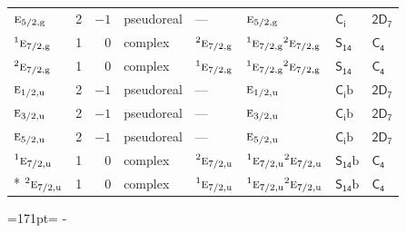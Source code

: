 \documentclass[10pt,a4paper]{article}
\newcommand{\needspace}[1]{\par\penalty-100\begingroup\dimen0=#1\relax\dimen2=\pagegoal
  \advance\dimen2-\pagetotal\ifdim\dimen0>\dimen2\relax\ifdim\dimen2>0pt\vfil\break\fi\fi
  \endgroup}
\numberwithin{equation}{section}
\newcommand{\grp}[1]{\mathsf{#1}}
\newcommand{\irr}[1]{\text{\normalfont\scshape #1}}
\newcommand{\conjpair}[1]{{}^{#1}}
\newcommand{\ptag}[1]{\mathrm{#1}}
\newcommand{\secondclass}{\mathrm{b}}
\begin{document}
{\begin{longtable}{@{}lrrlllll@{}}
$\irr{e}_{5/2,\ptag{g}}$ & 2 & $-1$ & pseudoreal & --- & $\irr{e}_{5/2,\ptag{g}}$ & \href{S2.pdf}{$\grp{C_{i}}$} & \href{2D7.pdf}{$\grp{2D_{7}}$}\\
$\conjpair{1}\irr{e}_{7/2,\ptag{g}}$ & 1 & $0$ & complex & $\conjpair{2}\irr{e}_{7/2,\ptag{g}}$ & $\conjpair{1}\irr{e}_{7/2,\ptag{g}}\conjpair{2}\irr{e}_{7/2,\ptag{g}}$ & \href{S14.pdf}{$\grp{S_{14}}$} & \href{../../../rotation/data/pdf/C4.pdf}{$\grp{C_{4}}$}\\
$\conjpair{2}\irr{e}_{7/2,\ptag{g}}$ & 1 & $0$ & complex & $\conjpair{1}\irr{e}_{7/2,\ptag{g}}$ & $\conjpair{1}\irr{e}_{7/2,\ptag{g}}\conjpair{2}\irr{e}_{7/2,\ptag{g}}$ & \href{S14.pdf}{$\grp{S_{14}}$} & \href{../../../rotation/data/pdf/C4.pdf}{$\grp{C_{4}}$}\\
$\irr{e}_{1/2,\ptag{u}}$ & 2 & $-1$ & pseudoreal & --- & $\irr{e}_{1/2,\ptag{u}}$ & \href{S2b.pdf}{$\grp{C_{i}}\secondclass$} & \href{2D7.pdf}{$\grp{2D_{7}}$}\\
$\irr{e}_{3/2,\ptag{u}}$ & 2 & $-1$ & pseudoreal & --- & $\irr{e}_{3/2,\ptag{u}}$ & \href{S2b.pdf}{$\grp{C_{i}}\secondclass$} & \href{2D7.pdf}{$\grp{2D_{7}}$}\\
$\irr{e}_{5/2,\ptag{u}}$ & 2 & $-1$ & pseudoreal & --- & $\irr{e}_{5/2,\ptag{u}}$ & \href{S2b.pdf}{$\grp{C_{i}}\secondclass$} & \href{2D7.pdf}{$\grp{2D_{7}}$}\\
$\conjpair{1}\irr{e}_{7/2,\ptag{u}}$ & 1 & $0$ & complex & $\conjpair{2}\irr{e}_{7/2,\ptag{u}}$ & $\conjpair{1}\irr{e}_{7/2,\ptag{u}}\conjpair{2}\irr{e}_{7/2,\ptag{u}}$ & \href{S14b.pdf}{$\grp{S_{14}}\secondclass$} & \href{../../../rotation/data/pdf/C4.pdf}{$\grp{C_{4}}$}\\*
$\conjpair{2}\irr{e}_{7/2,\ptag{u}}$ & 1 & $0$ & complex & $\conjpair{1}\irr{e}_{7/2,\ptag{u}}$ & $\conjpair{1}\irr{e}_{7/2,\ptag{u}}\conjpair{2}\irr{e}_{7/2,\ptag{u}}$ & \href{S14b.pdf}{$\grp{S_{14}}\secondclass$} & \href{../../../rotation/data/pdf/C4.pdf}{$\grp{C_{4}}$}\\
\bottomrule\end{longtable}}
\needspace{171pt}
\end{document}
